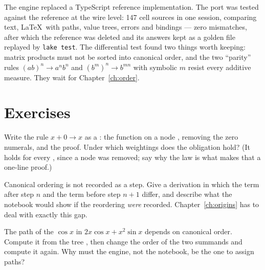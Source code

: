 \begin{logbox}
  The engine replaced a TypeScript reference implementation. The port was tested against the
  reference at the wire level: 147 cell sources in one session, comparing text, \LaTeX\ with paths,
  value trees, errors and bindings --- zero mismatches, after which the reference was deleted and
  its answers kept as a golden file replayed by \texttt{lake test}. The differential test found
  two things worth keeping: matrix products must not be sorted into canonical order, and the two
  ``parity'' rules $(ab)^n \to a^n b^n$ and $(b^m)^n \to b^{mn}$ with symbolic $m$ resist every
  additive measure. They wait for Chapter~\ref{ch:order}.
\end{logbox}

\section{Exercises}

\begin{exercisebox}
  Write the rule $x + 0 \to x$ as a : the  function on a node
  , removing the zero numerals, and the  proof. Under which weightings
  does the obligation hold? (It holds for every , since a node was removed; say why
  the  law is what makes that a one-line proof.)
\end{exercisebox}

\begin{exercisebox}
  Canonical ordering is not recorded as a step. Give a derivation in which the term after step $n$
  and the term before step $n{+}1$ differ, and describe what the notebook would show if the
  reordering \emph{were} recorded. Chapter~\ref{ch:origins} has to deal with exactly this gap.
\end{exercisebox}

\begin{exercisebox}[Paths]
  The path of the $\cos x$ in $2x\cos x + x^2\sin x$ depends on canonical order. Compute it from
  the tree , then change the order of the two
  summands and compute it again. Why must the engine, not the notebook, be the one to assign
  paths?
\end{exercisebox}
